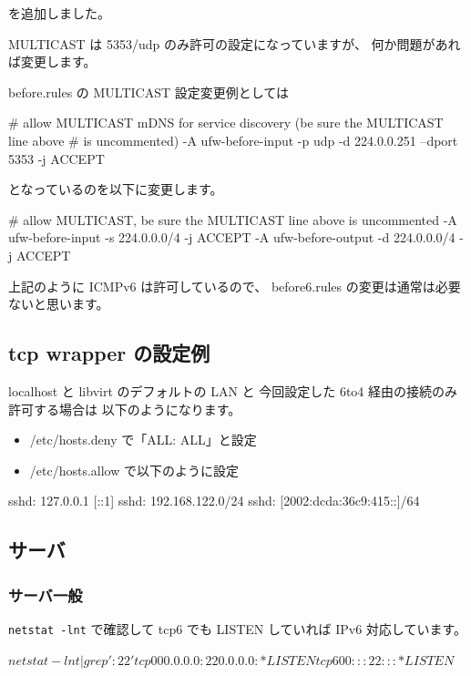 \documentclass[mingoth,a4paper]{jsarticle}
\begin{document}
を追加しました。


MULTICAST は 5353/udp のみ許可の設定になっていますが、
何か問題があれば変更します。

before.rules の MULTICAST 設定変更例としては

\begin{commandline}
# allow MULTICAST mDNS for service discovery (be sure the MULTICAST line above
# is uncommented)
-A ufw-before-input -p udp -d 224.0.0.251 --dport 5353 -j ACCEPT
\end{commandline}

となっているのを以下に変更します。

\begin{commandline}
# allow MULTICAST, be sure the MULTICAST line above is uncommented
-A ufw-before-input -s 224.0.0.0/4 -j ACCEPT
-A ufw-before-output -d 224.0.0.0/4 -j ACCEPT
\end{commandline}

上記のように ICMPv6 は許可しているので、
before6.rules の変更は通常は必要ないと思います。
\subsection{tcp wrapper の設定例}

localhost と libvirt のデフォルトの LAN と
今回設定した 6to4 経由の接続のみ許可する場合は
以下のようになります。

\begin{itemize}
\item /etc/hosts.deny で「ALL: ALL」と設定
\item /etc/hosts.allow で以下のように設定
\end{itemize}


\begin{commandline}
sshd: 127.0.0.1 [::1]
sshd: 192.168.122.0/24
sshd: [2002:dcda:36c9:415::]/64
\end{commandline}
\subsection{サーバ}
\subsubsection{サーバ一般}

\texttt{netstat -lnt} で確認して tcp6 でも LISTEN していれば IPv6 対応しています。

\begin{commandline}
$ netstat -lnt | grep ':22 '
tcp        0      0 0.0.0.0:22              0.0.0.0:*               LISTEN
tcp6       0      0 :::22                   :::*                    LISTEN
$
\end{commandline}
\end{document}
